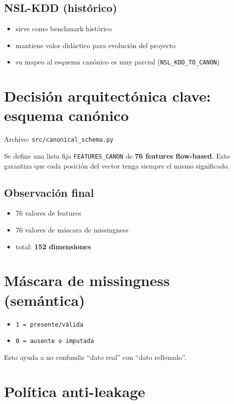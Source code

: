 ﻿\documentclass[12pt,a4paper]{article}
\begin{document}
\subsection{NSL-KDD (histórico)}

\begin{itemize}
  \item sirve como benchmark histórico
  \item mantiene valor didáctico para evolución del proyecto
  \item su mapeo al esquema canónico es muy parcial (\texttt{NSL\_KDD\_TO\_CANON})
\end{itemize}

\section{Decisión arquitectónica clave: esquema canónico}

Archivo: \verb|src/canonical_schema.py|

Se define una lista fija \texttt{FEATURES\_CANON} de \textbf{76 features flow-based}. Esto garantiza
que cada posición del vector tenga siempre el mismo significado.

\subsection{Observación final}

\begin{itemize}
  \item 76 valores de features
  \item 76 valores de máscara de missingness
  \item total: \textbf{152 dimensiones}
\end{itemize}

\section{Máscara de missingness (semántica)}

\begin{itemize}
  \item \texttt{1 = presente/válida}
  \item \texttt{0 = ausente o imputada}
\end{itemize}

Esto ayuda a no confundir ``dato real'' con ``dato rellenado''.

\section{Política anti-leakage}
\end{document}
